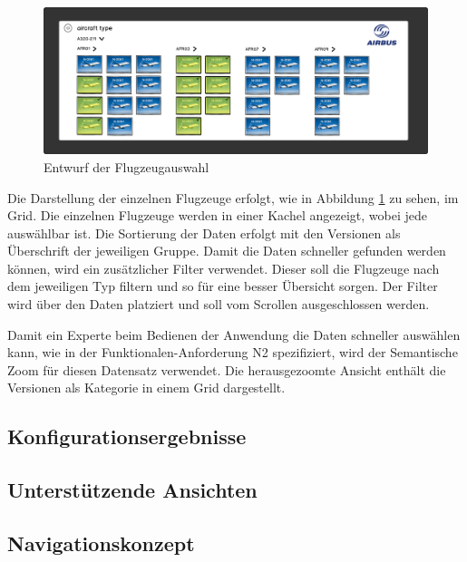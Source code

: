 \begin{figure}
\centering
\includegraphics[width=\hsize]{images/version_entwurf}
\caption{Entwurf der Flugzeugauswahl}
\label{aircraftSketch}
\end{figure}
Die Darstellung der einzelnen Flugzeuge erfolgt, wie in Abbildung \ref{aircraftSketch} zu sehen, im Grid. Die einzelnen Flugzeuge werden in einer Kachel angezeigt, wobei jede auswählbar ist. Die Sortierung der Daten erfolgt mit den Versionen als Überschrift der jeweiligen Gruppe. Damit die Daten schneller gefunden werden können, wird ein zusätzlicher Filter verwendet. Dieser soll die Flugzeuge nach dem jeweiligen Typ filtern und so für eine besser Übersicht sorgen. Der Filter wird über den Daten platziert und soll vom Scrollen ausgeschlossen werden. \par 

Damit ein Experte beim Bedienen der Anwendung die Daten schneller auswählen kann, wie in der Funktionalen-Anforderung N2 spezifiziert, wird der Semantische Zoom für diesen Datensatz verwendet. Die herausgezoomte Ansicht enthält die Versionen als Kategorie in einem Grid dargestellt. 

\subsection{Konfigurationsergebnisse}
\subsection{Unterstützende Ansichten}

\subsection{Navigationskonzept}
